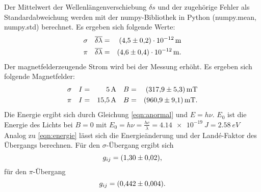 %
%
Der Mittelwert der Wellenlängenverschiebung $\delta s$ und der zugehörige Fehler als Standardabweichung werden mit der numpy-Bibliothek in Python (numpy.mean, numpy.std) berechnet.
Es ergeben sich folgende Werte:
\begin{align*}
  \sigma  &&  \overline{\delta \lambda} &=& \SI{4.5 \pm 0.2 e-12}{m} \\
  \pi     &&  \overline{\delta \lambda} &=& \SI{4.6 \pm 0.4 e-12}{m}. \\
\end{align*}
Der magnetfelderzeugende Strom wird bei der Messung erhöht.
Es ergeben sich folgende Magnetfelder:
\begin{align*}
  \sigma  &&   I &=& \SI{5}{A}     && B &=& \SI{317.9 \pm 5.3}{mT}\\
  \pi    &&   I &=& \SI{15.5}{A}  && B &=& \SI{960.9 \pm 9.1}{mT}.\\
\end{align*}
Die Energie ergibt sich durch Gleichung \eqref{eqn:anormal} und $E= h \nu$.
$E_0$ ist die Energie des Lichts bei $B=0$ mit $E_0=h \nu = \frac{hc}{\lambda}= \SI{4.14e-19}{J}=\SI{2.58}{eV}$
Analog zu \eqref{eqn:energie} lässt sich die Energieänderung und der Landé-Faktor des Übergangs berechnen.
Für den $\sigma$-Übergang ergibt sich
\begin{equation*}
  g_{ij} = \SI{1.30 \pm 0.02}{},
\end{equation*}
für den $\pi$-Übergang
\begin{equation*}
  g_{ij} = \SI{0.442 \pm 0.004}{}.
\end{equation*}

\FloatBarrier
%
